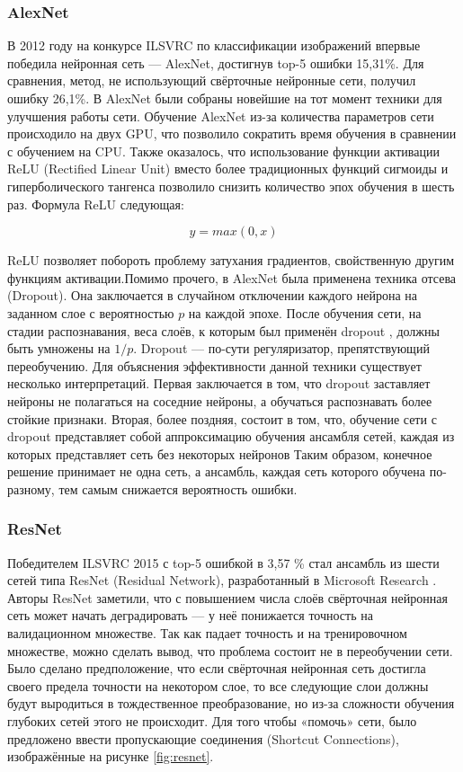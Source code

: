\subsubsection*{AlexNet}

В 2012 году на конкурсе ILSVRC по
классификации изображений впервые победила нейронная сеть — AlexNet, достигнув top-5 ошибки 15,31\%. Для сравнения, метод, не использующий свёрточные нейронные сети, получил ошибку 26,1\%. В AlexNet были собраны новейшие на тот момент техники для улучшения работы
сети.
Обучение AlexNet из-за количества параметров сети происходило на двух GPU, что позволило сократить время обучения в сравнении с обучением на CPU. Также оказалось, что
использование функции активации ReLU (Rectified Linear Unit) вместо более традиционных функций сигмоиды и гиперболического тангенса позволило снизить количество эпох обучения в шесть раз. Формула ReLU следующая:

\[y = max(0,x)\]

ReLU позволяет побороть проблему
затухания градиентов, свойственную другим
функциям активации.Помимо прочего, в AlexNet была
применена техника отсева (Dropout). Она заключается в случайном
отключении каждого нейрона на заданном
слое с вероятностью $ p $ на каждой эпохе.
После обучения сети, на стадии распознавания, веса слоёв, к которым был
применён dropout \cite{srivastava2014dropout}, должны быть умножены на
$1/p$. Dropout --- по-сути регуляризатор,
препятствующий переобучению.
Для объяснения эффективности данной техники
существует несколько интерпретаций. Первая заключается в том,
что dropout заставляет нейроны не полагаться на
соседние нейроны, а обучаться распознавать более стойкие признаки.
Вторая, более поздняя, состоит в том, что, обучение сети с dropout представляет собой
аппроксимацию обучения ансамбля сетей,
каждая из которых представляет сеть без
некоторых нейронов Таким образом, конечное решение принимает
не одна сеть, а ансамбль, каждая сеть
которого обучена по-разному, тем самым
снижается вероятность ошибки. 

\subsubsection*{ResNet}
Победителем ILSVRC 2015 с top-5 ошибкой в 3,57 \% стал ансамбль из шести
сетей типа ResNet (Residual Network), разработанный в Microsoft Research .
Авторы ResNet заметили, что с повышением числа слоёв свёрточная
нейронная сеть может начать деградировать — у неё понижается точность на
валидационном множестве. Так как падает точность и на тренировочном множестве,
можно сделать вывод, что проблема состоит не в переобучении сети.
Было сделано предположение, что если свёрточная нейронная сеть достигла своего
предела точности на некотором слое, то все следующие слои должны будут выродиться в
тождественное преобразование, но из-за сложности обучения глубоких сетей этого не
происходит. Для того чтобы «помочь» сети, было предложено ввести пропускающие
соединения (Shortcut Connections), изображённые на рисунке \ref{fig:resnet}.

